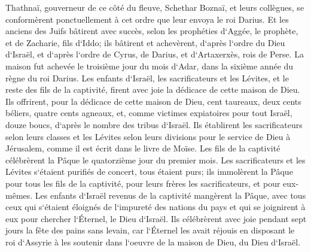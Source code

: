 \verse Thathnaï, gouverneur de ce côté du fleuve, Schethar Boznaï, et leurs collègues, se conformèrent ponctuellement à cet ordre que leur envoya le roi Darius. 
\verse Et les anciens des Juifs bâtirent avec succès, selon les prophéties d`Aggée, le prophète, et de Zacharie, fils d`Iddo; ils bâtirent et achevèrent, d`après l`ordre du Dieu d`Israël, et d`après l`ordre de Cyrus, de Darius, et d`Artaxerxès, rois de Perse. 
\verse La maison fut achevée le troisième jour du mois d`Adar, dans la sixième année du règne du roi Darius. 
\verse Les enfants d`Israël, les sacrificateurs et les Lévites, et le reste des fils de la captivité, firent avec joie la dédicace de cette maison de Dieu. 
\verse Ils offrirent, pour la dédicace de cette maison de Dieu, cent taureaux, deux cents béliers, quatre cents agneaux, et, comme victimes expiatoires pour tout Israël, douze boucs, d`après le nombre des tribus d`Israël. 
\verse Ils établirent les sacrificateurs selon leurs classes et les Lévites selon leurs divisions pour le service de Dieu à Jérusalem, comme il est écrit dans le livre de Moïse. 
\verse Les fils de la captivité célébrèrent la Pâque le quatorzième jour du premier mois. 
\verse Les sacrificateurs et les Lévites s`étaient purifiés de concert, tous étaient purs; ils immolèrent la Pâque pour tous les fils de la captivité, pour leurs frères les sacrificateurs, et pour eux-mêmes. 
\verse Les enfants d`Israël revenus de la captivité mangèrent la Pâque, avec tous ceux qui s`étaient éloignés de l`impureté des nations du pays et qui se joignirent à eux pour chercher l`Éternel, le Dieu d`Israël. 
\verse Ils célébrèrent avec joie pendant sept jours la fête des pains sans levain, car l`Éternel les avait réjouis en disposant le roi d`Assyrie à les soutenir dans l`oeuvre de la maison de Dieu, du Dieu d`Israël. 

